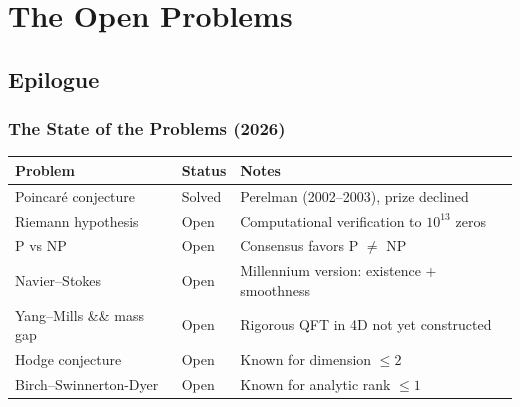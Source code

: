 \documentclass[11pt,a4paper]{book}
\theoremstyle{definition}
\begin{document}


\part{The Open Problems}








\appendix







\backmatter

\chapter*{Epilogue}

\section*{The State of the Problems (2026)}

\begin{center}
\begin{tabular}{lll}
\toprule
\textbf{Problem} & \textbf{Status} & \textbf{Notes} \\
\midrule
Poincar\'{e} conjecture & Solved & Perelman (2002--2003), prize declined \\
Riemann hypothesis & Open & Computational verification to $10^{13}$ zeros \\
P vs NP & Open & Consensus favors P $\neq$ NP \\
Navier--Stokes & Open & Millennium version: existence + smoothness \\
Yang--Mills \&\& mass gap & Open & Rigorous QFT in 4D not yet constructed \\
Hodge conjecture & Open & Known for dimension $\leq 2$ \\
Birch--Swinnerton-Dyer & Open & Known for analytic rank $\leq 1$ \\
\bottomrule
\end{tabular}
\end{center}
\end{document}
